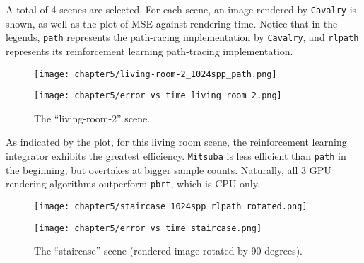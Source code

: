 A total of 4 scenes are selected. For each scene, an image rendered by \texttt{Cavalry} is shown, as well as the plot of MSE against rendering time. Notice that in the legends, \texttt{path} represents the path-racing implementation by \texttt{Cavalry}, and \texttt{rlpath} represents its reinforcement learning path-tracing implementation.

\thispagestyle{empty}
\enlargethispage{5\baselineskip}

\begin{figure}[H]
    \centering
    
    \begin{minipage}[t]{.99\textwidth}
        \centering
        \vspace{0pt}
        \texttt{[image: chapter5/living-room-2\_1024spp\_path.png]}
    \end{minipage}
    
    \vspace{0.1cm}

    \begin{minipage}[t]{.99\textwidth}
        \centering
        \vspace{0pt}
        \texttt{[image: chapter5/error\_vs\_time\_living\_room\_2.png]}
    \end{minipage}
    
    \caption{The ``living-room-2'' scene.}
\end{figure}

As indicated by the plot, for this living room scene, the reinforcement learning integrator exhibits the greatest efficiency. \texttt{Mitsuba} is less efficient than \texttt{path} in the beginning, but overtakes at bigger sample counts. Naturally, all 3 GPU rendering algorithms outperform \texttt{pbrt}, which is CPU-only.

\newpage

\begin{figure}[H]
    \centering
    
    \begin{minipage}[t]{.99\textwidth}
        \centering
        \vspace{0pt}
        \texttt{[image: chapter5/staircase\_1024spp\_rlpath\_rotated.png]}
    \end{minipage}
    
    \vspace{0.3cm}

    \begin{minipage}[t]{.99\textwidth}
        \centering
        \vspace{0pt}
        \texttt{[image: chapter5/error\_vs\_time\_staircase.png]}
    \end{minipage}
    
    \caption{The ``staircase'' scene (rendered image rotated by 90 degrees).}
\end{figure}

